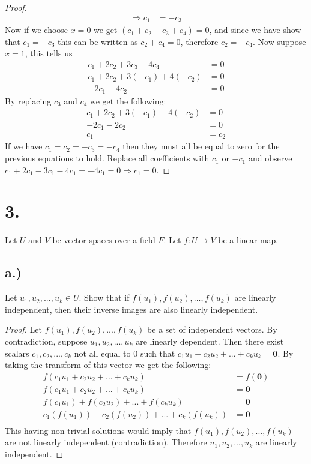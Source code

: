 \documentclass{article}
\begin{document}
\begin{proof}
\begin{align*}
	\Rightarrow c_1 & = -c_3 
	\end{align*}
	Now if we choose $x = 0$ we get $(c_1 + c_2 + c_3 + c_4) = 0$, and since we have show that $c_1 = -c_3$ this can be written as $c_2 + c_4 = 0$, therefore $c_2 = -c_4$.
	Now suppose $x = 1$, this tells us 
	\begin{align*}
	c_1 + 2c_2 + 3c_3 + 4c_4 & = 0\\
	c_1 + 2c_2 + 3(-c_1) + 4(-c_2) & = 0\\
	-2c_1-4c_2 & = 0
	\end{align*}
	By replacing $c_3$ and $c_4$ we get the following: 
	\begin{align*}
	c_1 + 2c_2 + 3(-c_1) + 4(-c_2) & = 0 \\
	-2c_1 -2c_2 & = 0 \\
	c_1 & = c_2
	\end{align*} If we have $c_1 = c_2 = -c_3 = -c_4$ then they must all be equal to zero for the previous equations to hold. Replace all coefficients with $c_1$ or $-c_1$ and observe $c_1 + 2c_1 - 3c_1 - 4c_1 = -4c_1 = 0 \Rightarrow c_1 = 0$.

\end{proof}

\section*{3.}
	Let $U$ and $V$ be vector spaces over a field $F$. Let $f:U \rightarrow V$ be a linear map.
	\subsection*{a.)}
		Let $u_1, u_2, ... , u_k \in U$. Show that if $f(u_1), f(u_2), ... ,f(u_k)$ are linearly independent, then their inverse images are also linearly independent.
		\begin{proof}
			Let $f(u_1), f(u_2), ... ,f(u_k)$ be a set of independent vectors.
			By contradiction, suppose $u_1, u_2, ... ,u_k$ are linearly dependent.
			Then there exist scalars $c_1, c_2, ... , c_k$ not all equal to 0 such that $c_1u_1 + c_2u_2 + ... + c_ku_k = \mathbf{0}$.
			By taking the transform of this vector we get the following:
			\begin{align*}
				f(c_1u_1 + c_2u_2 + ... + c_ku_k) & = f(\mathbf{0}) \\
				f(c_1u_1 + c_2u_2 + ... + c_ku_k) & = \mathbf{0} \\
				f(c_1u_1) + f(c_2  u_2) + ... + f(c_k u_k) & = \mathbf{0} \\
				c_1(f(u_1)) + c_2(f(u_2)) + ... +c_k(f(u_k)) & = \mathbf{0} \\
			\end{align*}
			This having non-trivial solutions would imply that $f(u_1), f(u_2), ... ,f(u_k)$ are not linearly independent (contradiction).
			Therefore $u_1, u_2, ... ,u_k$ are linearly independent.

		\end{proof}
\end{document}
